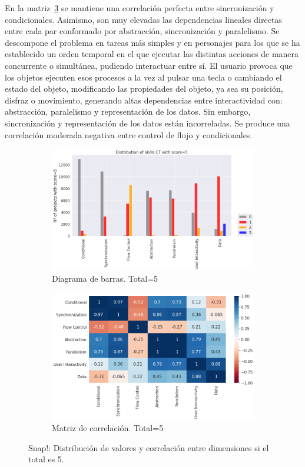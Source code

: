 \documentclass[a4paper, 12pt]{book}
\begin{document}
En la matriz~\ref{fig:corr5_Snap} se mantiene una correlación perfecta entre sincronización y condicionales. Asimismo, son muy elevadas las dependencias lineales directas entre cada par conformado por abstracción, sincronización y paralelismo. Se descompone el problema en tareas más simples y en personajes para los que se ha establecido un orden temporal en el que ejecutar las distintas acciones de manera concurrente o simultánea, pudiendo interactuar entre sí. El usuario provoca que los objetos ejecuten esos procesos a la vez al pulsar una tecla o cambiando el estado del objeto, modificando las propiedades del objeto, ya sea su posición, disfraz o movimiento, generando altas dependencias entre interactividad con: abstracción, paralelismo y representación de los datos. Sin embargo, sincronización y representación de los datos están incorreladas. Se produce una correlación moderada negativa entre control de flujo y condicionales. 

\begin{figure}[H]
    \centering
    \begin{subfigure}[h]{.49\textwidth} 
        \includegraphics[width=\textwidth]{img/distribucion_5_Snap}
        \caption{Diagrama de barras. Total=5}
        \label{fig:total5_Snap}
    \end{subfigure}       
    \begin{subfigure}[h]{.49\textwidth} 
        \includegraphics[width=\textwidth]{img/corr_5_Snap}
        \caption{Matriz de correlación. Total=5}
        \label{fig:corr5_Snap}
    \end{subfigure}
    \caption{Snap!: Distribución de valores y correlación entre dimensiones si el total es 5.}
\end{figure}
\end{document}
